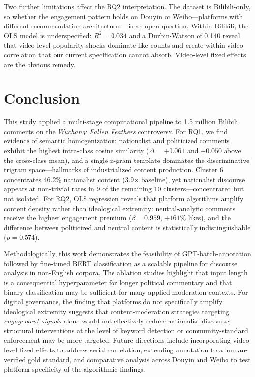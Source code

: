 \documentclass[man, 12pt, mask, floatsintext]{apa7}
\begin{document}
Two further limitations affect the RQ2 interpretation. The dataset is Bilibili-only, so whether the engagement pattern holds on Douyin or Weibo---platforms with different recommendation architectures---is an open question. Within Bilibili, the OLS model is underspecified: $R^2 = 0.034$ and a Durbin-Watson of 0.140 reveal that video-level popularity shocks dominate like counts and create within-video correlation that our current specification cannot absorb. Video-level fixed effects are the obvious remedy.

\section{Conclusion}

This study applied a multi-stage computational pipeline to 1.5 million Bilibili comments on the \textit{Wuchang: Fallen Feathers} controversy. For RQ1, we find evidence of semantic homogenization: nationalist and politicized comments exhibit the highest intra-class cosine similarity ($\Delta = +0.061$ and $+0.050$ above the cross-class mean), and a single n-gram template dominates the discriminative trigram space---hallmarks of industrialized content production. Cluster 6 concentrates 46.2\% nationalist content (3.9$\times$ baseline), yet nationalist discourse appears at non-trivial rates in 9 of the remaining 10 clusters---concentrated but not isolated. For RQ2, OLS regression reveals that platform algorithms amplify content density rather than ideological extremity: neutral-analytic comments receive the highest engagement premium ($\beta = 0.959$, $+161\%$ likes), and the difference between politicized and neutral content is statistically indistinguishable ($p = 0.574$).

Methodologically, this work demonstrates the feasibility of GPT-batch-annotation followed by fine-tuned BERT classification as a scalable pipeline for discourse analysis in non-English corpora. The ablation studies highlight that input length is a consequential hyperparameter for longer political commentary and that binary classification may be sufficient for many applied moderation contexts. For digital governance, the finding that platforms do not specifically amplify ideological extremity suggests that content-moderation strategies targeting \textit{engagement signals} alone would not effectively reduce nationalist discourse; structural interventions at the level of keyword detection or community-standard enforcement may be more targeted. Future directions include incorporating video-level fixed effects to address serial correlation, extending annotation to a human-verified gold standard, and comparative analysis across Douyin and Weibo to test platform-specificity of the algorithmic findings.
\end{document}
